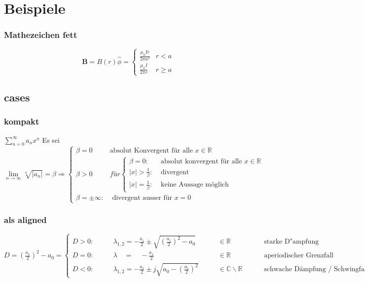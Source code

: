 \section{Beispiele}
	\subsubsection{Mathezeichen fett}
		\begin{equation*}		%
			\mathbf{B}=B(r) \hat{\phi}=\left\{\begin{array}{ll}{\frac{\mu_{0} I r}{2 \pi a^{2}}} & {r<a} \\ {\frac{\mu_{0} I}{2 \pi r}} & {r \geq a}\end{array}\right.
		\end{equation*}

	\subsection{cases}
		\subsubsection{kompakt}
			$\sum\limits_{n=0}^{\infty}a_n x^n$ Es sei $\lim\limits_{n\to\infty}\sqrt[n]{|a_n|}=\beta \Rightarrow
			\begin{cases}
			\beta=0 & \text{absolut Konvergent für alle } x\in\mathbb{R}\\
			\beta>0 & für 
			\begin{cases}
			\beta=0: & \text { absolut konvergent für alle } x \in \mathbb{R}\\
			|x|>\frac{1}{\beta}: & \text { divergent }\\
			|x|=\frac{1}{\beta} : & \text { keine Aussage möglich }
			\end{cases}\\
			\beta=\pm \infty : & \text { divergent ausser für } x=0
			\end{cases}$\\
		\subsubsection{als aligned}
			$
			D = \left(\frac{a_{1}}{2}\right)^{2}-a_{0} =
			\left\{
			\begin{aligned}
			D>0: & \qquad \lambda_{1,2}=-\frac{a_{1}}{2} \pm \sqrt{\left(\frac{a_{1}}{2}\right)^{2}-a_{0}} & \qquad \in \mathbb{R} & \qquad \text{ starke D"ampfung }
			\\
			D=0: & \qquad \lambda \quad=\quad-\frac{a_{1}}{2} & \qquad \in \mathbb{R} & \qquad \text{ aperiodischer Grenzfall }
			\\
			D<0: & \qquad \lambda_{1,2}=-\frac{a_{1}}{2} \pm j \sqrt{a_{0}-\left(\frac{a_{1}}{2}\right)^{2}} & \qquad \in \mathbb{C}  \backslash \mathbb{R} & \qquad  \text{ schwache Dämpfung / Schwingfall }
			\end{aligned} \right.
			$
			

